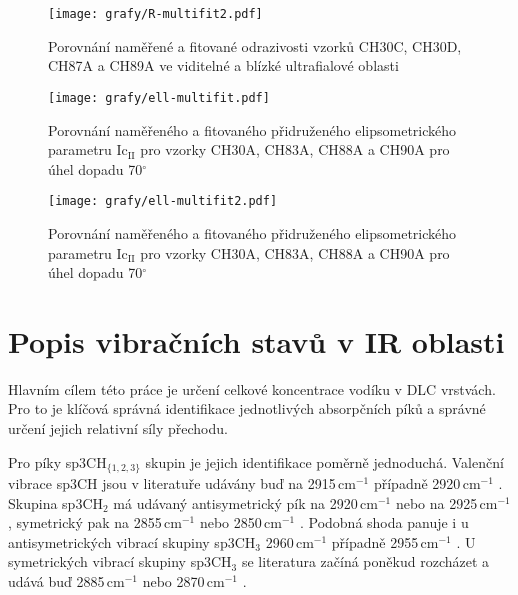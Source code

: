 \begin{figure}[ht]
	\texttt{[image: grafy/R-multifit2.pdf]}
	\caption{Porovnání naměřené a fitované odrazivosti vzorků CH30C, CH30D, CH87A a CH89A ve viditelné a blízké ultrafialové oblasti}
	\label{R-multifit2}
\end{figure}

\begin{figure}[ht]
	\texttt{[image: grafy/ell-multifit.pdf]}
	\caption{Porovnání naměřeného a fitovaného přidruženého elipsometrického parametru Ic$_{\mathrm{II}}$ pro vzorky CH30A, CH83A, CH88A a CH90A pro úhel dopadu 70$^\circ$}
	\label{ell-multifit}
\end{figure}

\begin{figure}[ht]
	\texttt{[image: grafy/ell-multifit2.pdf]}
	\caption{Porovnání naměřeného a fitovaného přidruženého elipsometrického parametru Ic$_{\mathrm{II}}$ pro vzorky CH30A, CH83A, CH88A a CH90A pro úhel dopadu 70$^\circ$}
	\label{ell-multifit2}
\end{figure}

\clearpage

\section{Popis vibračních stavů v IR oblasti}
Hlavním cílem této práce je určení celkové koncentrace vodíku v DLC vrstvách. Pro to je klíčová správná identifikace jednotlivých absorpčních píků a správné určení jejich relativní síly přechodu.

Pro píky sp3CH$_{\{1,2,3\}}$ skupin je jejich identifikace poměrně jednoduchá. Valenční vibrace sp3CH jsou v literatuře udávány buď na 2915\,cm$^{-1}$ \cite{Zajickova2011, Dischler1983} případně 2920\,cm$^{-1}$ \cite{Robertson2002, Ristein1998}. Skupina sp3CH$_2$ má udávaný antisymetrický pík na 2920\,cm$^{-1}$ \cite{Dischler1983, Robertson2002, Ristein1998} nebo na 2925\,cm$^{-1}$ \cite{Zajickova2011}, symetrický pak na 2855\,cm$^{-1}$ \cite{Robertson2002, Ristein1998, Zajickova2011} nebo 2850\,cm$^{-1}$ \cite{Dischler1983}. Podobná shoda panuje i u antisymetrických vibrací skupiny sp3CH$_3$ 2960\,cm$^{-1}$ \cite{Zajickova2011, Dischler1983} případně 2955\,cm$^{-1}$ \cite{Robertson2002, Ristein1998}. U symetrických vibrací skupiny sp3CH$_3$ se literatura začíná poněkud rozcházet a udává buď 2885\,cm$^{-1}$ \cite{Robertson2002, Ristein1998} nebo 2870\,cm$^{-1}$ \cite{Zajickova2011, Dischler1983}. 

